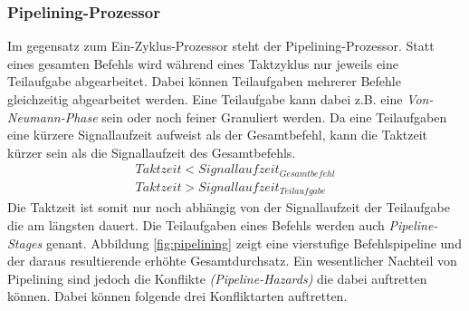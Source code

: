             \subsubsection{Pipelining-Prozessor}
                Im gegensatz zum Ein-Zyklus-Prozessor steht der Pipelining-Prozessor.
                Statt eines gesamten Befehls wird während eines Taktzyklus nur jeweils eine Teilaufgabe abgearbeitet.
                Dabei können Teilaufgaben mehrerer Befehle gleichzeitig abgearbeitet werden.
                Eine Teilaufgabe kann dabei z.B. eine \textit{Von-Neumann-Phase} sein oder noch feiner Granuliert werden.
                Da eine Teilaufgaben eine kürzere Signallaufzeit aufweist als der Gesamtbefehl,
                kann die Taktzeit kürzer sein als die Signallaufzeit des Gesamtbefehls.
                \begin{equation}
                    \begin{split}
                        Taktzeit < Signallaufzeit_{Gesamtbefehl} \\
                        Taktzeit > Signallaufzeit_{Teilaufgabe}
                    \end{split}
                \end{equation}
                Die Taktzeit ist somit nur noch abhängig von der Signallaufzeit der Teilaufgabe die am längsten dauert.
                Die Teilaufgaben eines Befehls werden auch \textit{Pipeline-Stages} genant.
                Abbildung \ref{fig:pipelining} zeigt eine vierstufige Befehlspipeline und der daraus resultierende erhöhte Gesamtdurchsatz.
                Ein wesentlicher Nachteil von Pipelining sind jedoch die Konflikte \textit{(Pipeline-Hazards)}
                die dabei auftretten können. Dabei können folgende drei Konfliktarten auftretten.
    
